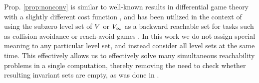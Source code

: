  \begin{rem} 
   Prop. \ref{prop:nonconv} is similar to well-known results in differential game theory with a slightly different cost function \cite{Akametalu2014}, and has been utilized in the context of using the subzero level set of $V$ or $V_\infty$ as a backward reachable set for tasks such as collision avoidance or reach-avoid games \cite{Mitchell05}. In this work we do not assign special meaning to any particular level set, and instead consider all level sets at the same time. This effectively allows us to effectively solve many simultaneous reachability problems in a single computation, thereby removing the need to check whether resulting invariant sets are empty, as was done in \cite{Bansal2017}.
 \end{rem}

